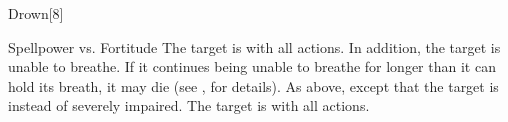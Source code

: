 \begin{spellsection}{Drown}[8]
    \begin{spellheader}
    \end{spellheader}
    \begin{spellcontent}
        \begin{spelltargetinginfo}
        \end{spelltargetinginfo}
        \begin{spelleffects}
            \begin{spellattack}{Spellpower vs. Fortitude}
                \spellsuccess The target is \severelyimpaired with all actions.
                In addition, the target is unable to breathe.
                If it continues being unable to breathe for longer than it can hold its breath, it may die (see , for details).
                \spellcritical As above, except that the target is \nauseated instead of severely impaired.
                \spellfailure The target is \impaired with all actions.
            \end{spellattack}
            \spelldur \durshort
        \end{spelleffects}
    \end{spellcontent}
    \begin{spellfooter}
        \miscastexplode
    \end{spellfooter}
\end{spellsection}


